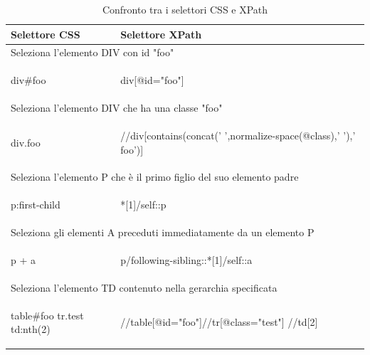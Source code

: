 \begin{table}[htdp]
\caption{Confronto tra i selettori CSS e XPath}
\begin{center}
\begin{tabular}{| p{6cm} | p{8cm} |}
\hline
	\textbf{Selettore CSS} & \textbf{Selettore XPath} \\
\hline
\multicolumn{2}{|l|}{Seleziona l'elemento DIV con id "foo"} \\
\hline
	\begin{spverbatim}
		div#foo
	\end{spverbatim}
	&
	\begin{spverbatim}
		div[@id="foo"]
	\end{spverbatim} \\
\hline
\multicolumn{2}{|l|}{Seleziona l'elemento DIV che ha una classe "foo"} \\
\hline
	\begin{spverbatim}
		div.foo 
	\end{spverbatim}
	& 
	\begin{spverbatim} 
		//div[contains(concat(' ',normalize-space(@class),' '),' foo')] 
	\end{spverbatim}  \\
\hline
\multicolumn{2}{|l|}{ Seleziona l'elemento P che è il primo figlio del suo elemento padre } \\\hline
	\begin{spverbatim}
		p:first-child
	\end{spverbatim}
	&
	\begin{spverbatim}
		*[1]/self::p
	\end{spverbatim} \\
\hline
\multicolumn{2}{|l|}{Seleziona gli elementi A preceduti immediatamente da un elemento P} \\\hline
	\begin{spverbatim}
		p + a 
	\end{spverbatim}	
	& 
	\begin{spverbatim}
		p/following-sibling::*[1]/self::a
	\end{spverbatim} \\
\hline
\multicolumn{2}{|l|}{Seleziona l'elemento TD contenuto nella gerarchia specificata} \\\hline
	\begin{spverbatim}
		table#foo tr.test td:nth(2)
	\end{spverbatim}
	& 
	\begin{spverbatim}
		//table[@id="foo"]//tr[@class="test"] //td[2]
	\end{spverbatim} \\
\hline
\end{tabular}
\end{center}
\label{table:cssVsXpath}
\end{table}

